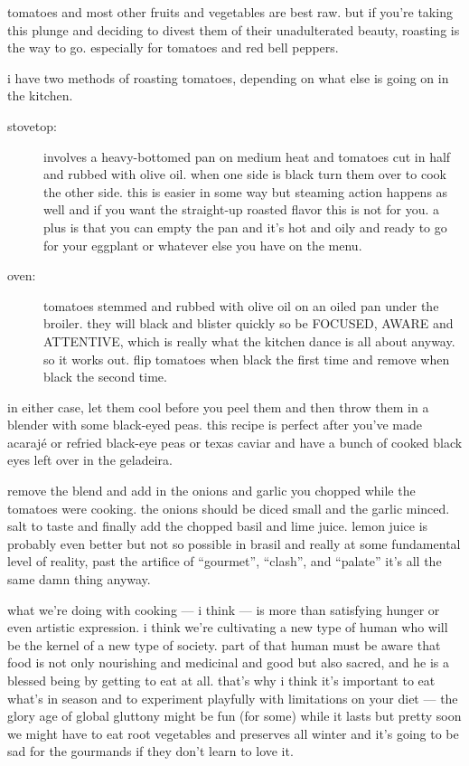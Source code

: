 tomatoes and most other fruits and vegetables are best raw. but if
you're taking this plunge and deciding to divest them of their
unadulterated beauty, roasting is the way to go. especially for
tomatoes and red bell peppers.

i have two methods of roasting tomatoes, depending on what else is
going on in the kitchen.

\begin{description}
  \item[stovetop:] involves a heavy-bottomed pan on medium heat and
  tomatoes cut in half and rubbed with olive oil. when one side is
  black turn them over to cook the other side. this is easier in some
  way but steaming action happens as well and if you want the
  straight-up roasted flavor this is not for you. a plus is that you
  can empty the pan and it's hot and oily and ready to go for your
  eggplant or whatever else you have on the menu.

  \item[oven:] tomatoes stemmed and rubbed with olive oil on an oiled
  pan under the broiler. they will black and blister quickly so be
  FOCUSED, AWARE and ATTENTIVE, which is really what the kitchen dance
  is all about anyway. so it works out. flip tomatoes when black the
  first time and remove when black the second time.
\end{description}

in either case, let them cool before you peel them and then throw them
in a blender with some black-eyed peas. this recipe is perfect after
you've made acaraj\'{e} or refried black-eye peas or texas caviar and
have a bunch of cooked black eyes left over in the
\gls{geladeira}.

remove the blend and add in the onions and garlic you chopped while
the tomatoes were cooking. the onions should be diced small and the
garlic minced. salt to taste and finally add the chopped basil and
lime juice. lemon juice is probably even better but not so possible in
brasil and really at some fundamental level of reality, past the
artifice of ``gourmet'', ``clash'', and ``palate'' it's all the same
damn thing anyway.

what we're doing with cooking --- i think --- is more than satisfying
hunger or even artistic expression. i think we're cultivating a new
type of human who will be the kernel of a new type of society. part of
that human must be aware that food is not only nourishing and
medicinal and good but also sacred, and he is a blessed being by
getting to eat at all. that's why i think it's important to eat what's
in season and to experiment playfully with limitations on your diet
--- the glory age of global gluttony might be fun (for some) while it
lasts but pretty soon we might have to eat root vegetables and
preserves all winter and it's going to be sad for the gourmands if
they don't learn to love it.

